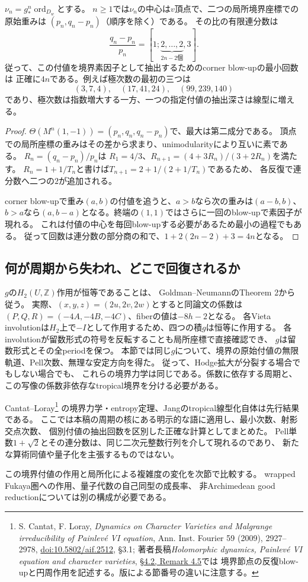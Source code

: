 \begin{proposition}[一つの反復付値を抽出するのに必要な正確な回数]
\label{prop:pell-corner-depth}
$\nu_n=g_*^n\operatorname{ord}_{D_w}$とする。
$n\ge1$では$\nu_n$の中心は$v$頂点で、二つの局所境界座標での原始重みは
$(p_n,q_n-p_n)$（順序を除く）である。
その比の有限連分数は
\[
 \frac{q_n-p_n}{p_n}
 =[1;\underbrace{2,\ldots,2}_{2n-2\text{個}},3].
\]
従って、この付値を境界素因子として抽出するためのcorner blow-upの最小回数は
正確に$4n$である。例えば極次数の最初の三つは
\[
 (3,7,4),\quad(17,41,24),\quad(99,239,140)
\]
であり、極次数は指数増大する一方、一つの指定付値の抽出深さは線型に増える。
\end{proposition}
\begin{proof}
$\Theta(M^n(1,-1))=(p_n,q_n,q_n-p_n)$で、最大は第二成分である。
頂点での局所座標の重みはその差から求まり、unimodularityにより互いに素である。
$R_n=(q_n-p_n)/p_n$は
$R_1=4/3$、$R_{n+1}=(4+3R_n)/(3+2R_n)$を満たす。
$R_n=1+1/T_n$と書けば$T_{n+1}=2+1/(2+1/T_n)$であるため、
各反復で連分数へ二つの$2$が追加される。

corner blow-upで重み$(a,b)$の付値を追うと、$a>b$なら次の重みは$(a-b,b)$、
$b>a$なら$(a,b-a)$となる。終端の$(1,1)$ではさらに一回のblow-upで素因子が現れる。
これは付値の中心を毎回blow-upする必要があるため最小の過程でもある。
従って回数は連分数の部分商の和で、$1+2(2n-2)+3=4n$となる。
\end{proof}

\subsection{何が周期から失われ、どこで回復されるか}
$g$の$H_2(U,\mathbb Z)$作用が恒等であることは、
Goldman--Neumann\cite{BoundaryGoldmanNeumann}のTheorem 2から従う。
実際、$(x,y,z)=(2u,2v,2w)$とすると同論文の係数は
$(P,Q,R)=(-4A,-4B,-4C)$、fiberの値は$-8h-2$となる。
各Vieta involutionは$H_2$上で$-I$として作用するため、四つの積$g$は恒等に作用する。
各involutionが留数形式の符号を反転することも局所座標で直接確認でき、
$g$は留数形式とその全periodを保つ。
本節では同じ$g$について、境界の原始付値の無限軌道、Pell次数、無理な安定方向を得た。
従って、Hodge拡大が分裂する場合でもしない場合でも、
これらの境界力学は同じである。係数に依存する周期と、
この写像の係数非依存なtropical境界を分ける必要がある。

Cantat--Loray\footnote{S. Cantat, F. Loray,
\emph{Dynamics on Character Varieties and Malgrange irreducibility of Painlev\'e VI equation},
Ann. Inst. Fourier 59 (2009), 2927--2978,
\href{https://doi.org/10.5802/aif.2512}{doi:10.5802/aif.2512}, \S3.1;
著者長稿\emph{Holomorphic dynamics, Painlev\'e VI equation and character varieties},
\href{https://perso.univ-rennes1.fr/serge.cantat/Articles/painleve_long.pdf}{\S4.2, Remark 4.5}では
境界節点の反復blow-upと円周作用を記述する。版による節番号の違いに注意する。}
の境界力学・entropy定理、Jangのtropical線型化自体は先行結果である。
ここでは本稿の周期の核にある明示的な語に適用し、最小次数、射影交点次数、
個別付値の抽出回数を区別した正確な計算としてまとめた。
Pell単数$1+\sqrt2$とその連分数は、同じ二次元整数行列を介して現れるのであり、
新たな算術同値や量子化を主張するものではない。

この境界付値の作用と局所化による複雑度の変化を次節で比較する。
wrapped Fukaya圏への作用、量子代数の自己同型の成長率、
非Archimedean good reductionについては別の構成が必要である。
